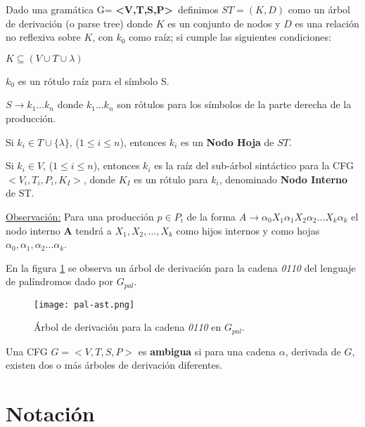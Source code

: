\begin{definition}
\label{def:arbolderivacion}
Dado una gramática G= \textbf{<V,T,S,P>}\, definimos $ST = (K,D)$ como un árbol de derivación (o parse tree) donde $K$ es un conjunto de nodos y $D$ es una relación no reflexiva sobre $K$, con $k_0$ como raíz; si cumple las siguientes condiciones:

\begin{items}
\item $ K \subseteq (V \cup T \cup \lambda) $
\item $k_{0}$ es un rótulo raíz para el símbolo S.
\item $ S \rightarrow k_{1} \ldots k_{n} $ donde $k_{1} \ldots k_{n}$ son rótulos para los símbolos de la parte derecha de la producción.
\item Si $k_{i} \in T \cup \{\lambda\}$, ($1 \leq i \leq n$), entonces $k_{i}$ es un \textbf{Nodo Hoja} de $ST$. 
\item Si $k_{i} \in V$,  ($1 \leq i \leq n$), entonces $k_{i}$ es la raíz del 
      sub-árbol sintáctico para la CFG $<V_{i},T_{i},P_{i},K_I>$, donde $K_{I}$ es un rótulo para $k_{i}$, denominado \textbf{Nodo Interno} de ST.
\end{items}
\end{definition}

\underline{Observación:} Para una producción $p\in P_{i}$ de la forma $A\rightarrow \alpha_{0}X_{1}\alpha_{1}X_{2}\alpha_{2} \ldots X_{k}\alpha_{k}$ el nodo interno \textbf{A} tendrá a $X_{1}, X_{2},\dots, X_{k}$ como hijos internos y como hojas $\alpha_{0}, \alpha_{1}, \alpha_{2} \ldots \alpha_{k}$.

En la figura \ref{fig:ejePala-st} se observa un árbol de derivación para la cadena \textit{0110} del lenguaje de palíndromos dado por $G_{pal}$.

\begin{figure}[h!]\centering
\texttt{[image: pal-ast.png]}
\caption{\label{fig:ejePala-st} Árbol de derivación para la cadena \textit{0110} en $G_{pal}$.}
\end{figure}


\begin{definition} Una CFG $G = <V,T,S,P>$ es \textbf{ambigua} si para una cadena $\alpha$, derivada de $G$, existen dos o más árboles de derivación diferentes.
\label{def:ambigua}
\end{definition}

\section*{Notación}

